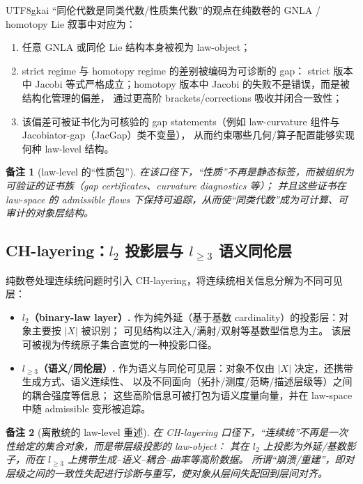 \documentclass[12pt]{article}
\newtheorem{remark}{备注}[section]
\begin{document}
\begin{CJK*}{UTF8}{gkai}
“同伦代数是同类代数/性质集代数”的观点在纯数卷的 GNLA / homotopy Lie 叙事中对应为：
\begin{enumerate}
  \item 任意 GNLA 或同伦 Lie 结构本身被视为 law-object；
  \item strict regime 与 homotopy regime 的差别被编码为可诊断的 gap：
  strict 版本中 Jacobi 等式严格成立；homotopy 版本中 Jacobi 的失败不是错误，而是被结构化管理的偏差，
  通过更高阶 brackets/corrections 吸收并闭合一致性；
  \item 该偏差可被证书化为可核验的 gap statements（例如 law-curvature 组件与 Jacobiator-gap（JacGap）类不变量），
  从而约束哪些几何/算子配置能够实现何种 law-level 结构。
\end{enumerate}

\begin{remark}[law-level 的“性质包”]
在该口径下，“性质”不再是静态标签，而被组织为可验证的证书族（gap certificates、curvature diagnostics 等）；
并且这些证书在 law-space 的 admissible flows 下保持可追踪，从而使“同类代数”成为可计算、可审计的对象层结构。
\end{remark}

\subsection{CH-layering：\texorpdfstring{$l_2$}{l2} 投影层与 \texorpdfstring{$l_{\ge 3}$}{l>=3} 语义同伦层}
\label{subsec:tex19-ch2-ch-layering}

纯数卷处理连续统问题时引入 CH-layering，将连续统相关信息分解为不同可见层：\cite{Jech2003}
\begin{itemize}
  \item \textbf{$l_2$（binary-law layer）.}
  作为纯外延（基于基数 cardinality）的投影层：对象主要按 $|X|$ 被识别；
  可见结构以注入/满射/双射等基数型信息为主。
  该层可被视为传统原子集合直觉的一种投影口径。
  \item \textbf{$l_{\ge 3}$（语义/同伦层）.}
  作为语义与同伦可见层：对象不仅由 $|X|$ 决定，还携带生成方式、语义连续性、
  以及不同面向（拓扑/测度/范畴/描述层级等）之间的耦合强度等信息；
  这些高阶信息可被打包为语义度量向量，并在 law-space 中随 admissible 变形被追踪。
\end{itemize}

\begin{remark}[离散统的 law-level 重述]
在 CH-layering 口径下，“连续统”不再是一次性给定的集合对象，而是带层级投影的 law-object：
其在 $l_2$ 上投影为外延/基数影子，而在 $l_{\ge 3}$ 上携带生成--语义--耦合--曲率等高阶数据。
所谓“崩溃/重建”，即对层级之间的一致性失配进行诊断与重写，使对象从层间失配回到层间对齐。
\end{remark}


\end{CJK*}
\end{document}

